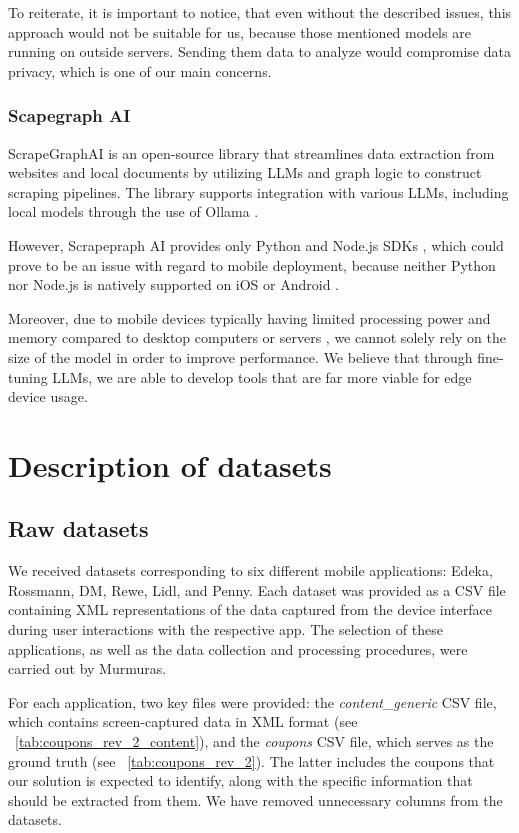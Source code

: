 \documentclass[licencjacka,en]{pracamgr}
\begin{document}
To reiterate, it is important to notice, that even without the described issues, this approach would not be suitable for us, because those mentioned models are running on outside servers. Sending them data to analyze would compromise data privacy, which is one of our main concerns.

\subsection{Scapegraph AI}
ScrapeGraphAI\cite{scapegraph_repo} is an open-source library that streamlines data extraction from websites and local documents by utilizing LLMs and graph logic to construct scraping pipelines. The library supports integration with various LLMs, including local models through the use of Ollama \cite{ollama_repo, scapegraph_usage}.

However, Scrapepraph AI provides only Python and Node.js SDKs \cite{scapegraph_sdks}, which could prove to be an issue with regard to mobile deployment, because neither Python nor Node.js is natively supported on iOS or Android \cite{android_dev_site, ios_dev_site}.

Moreover, due to mobile devices typically having limited processing power and memory compared to desktop computers or servers \cite{mobile_resources}, we cannot solely rely on the size of the model in order to improve performance. We believe that through fine-tuning LLMs, we are able to develop tools that are far more viable for edge device usage.

\chapter{Description of datasets} \label{chap:datasets}
\section{Raw datasets}
We received datasets corresponding to six different mobile applications: Edeka, Rossmann, DM, Rewe, Lidl, and Penny. Each dataset was provided as a CSV file containing XML representations of the data captured from the device interface during user interactions with the respective app. The selection of these applications, as well as the data collection and processing procedures, were carried out by Murmuras.

For each application, two key files were provided: the \textit{content\_generic} CSV file, which contains screen-captured data in XML format (see ~\ref{tab:coupons_rev_2_content}), and the \textit{coupons} CSV file, which serves as the ground truth (see ~\ref{tab:coupons_rev_2}). The latter includes the coupons that our solution is expected to identify, along with the specific information that should be extracted from them. We have removed unnecessary columns from the datasets.
\end{document}

